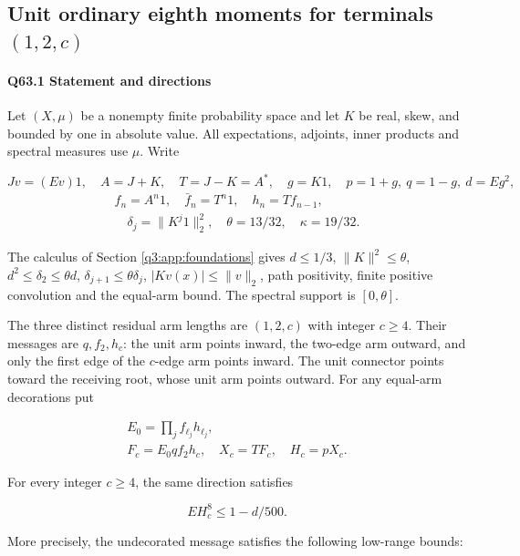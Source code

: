 \subsection{Unit ordinary eighth moments for terminals $(1,\allowbreak 2,\allowbreak c)$}\label{proof:Q5-C063}
\paragraph{Q63.1 Statement and directions}

Let $(X,\allowbreak  \mu)$ be a nonempty finite probability space and let $K$ be real, skew, and bounded by one in absolute value.
All expectations, adjoints, inner products and spectral measures use $\mu$. Write

\[
Jv=(Ev)1,\quad A=J+K,\quad T=J-K=A^*,\quad g=K1,
\quad p=1+g,\ q=1-g,\ d=Eg^2,
\]
\[
\begin{gathered}
f_n=A^n1,\quad \bar f_n=T^n1,\quad h_n=T f_{n-1},\\
\quad \delta_j=\|K^j1\|_2^2,\quad\theta=13/32,\quad\kappa=19/32.
\end{gathered}
\]

The calculus of Section \ref{q3:app:foundations} gives $d\le\allowbreak 1/3$, $\|K\|^2\le\allowbreak \theta$, $d^2\le\allowbreak  \delta_2\le\allowbreak \theta d$,
$\delta_{j+1}\le\allowbreak \theta \delta_j$, $|Kv(x)|\le\allowbreak \|v\|_2$, path positivity, finite positive convolution and the equal-arm bound.
The spectral support is $[0,\allowbreak  \theta]$.

The three distinct residual arm lengths are $(1,\allowbreak  2,\allowbreak  c)$ with integer $c\ge\allowbreak 4$. Their messages are
$q,\allowbreak  f_2,\allowbreak  h_c$: the unit arm points inward, the two-edge arm outward, and only the first edge of the $c$-edge arm points inward.
The unit connector points toward the receiving root, whose unit arm points outward. For any equal-arm decorations put

\[
\begin{gathered}
E_0=\prod_j f_{\ell_j}h_{\ell_j},\qquad\\
F_c=E_0qf_2h_c,\quad X_c=TF_c,\quad H_c=pX_c.
\end{gathered}\tag{Q63.1.1}\label{eq:Q63:Q63:1:1}
\]

For every integer $c\ge\allowbreak 4$, the same direction satisfies

\[
\boxed{EH_c^8\le1-d/500.}
\tag{Q63.1.2}\label{eq:Q63:Q63:1:2}
\]

More precisely, the undecorated message satisfies the following low-range bounds:

